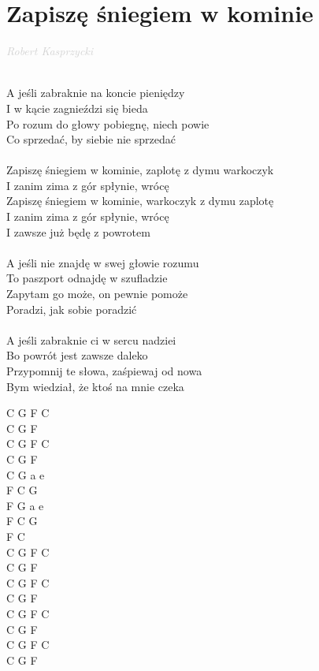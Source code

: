 \documentclass[a5paper, 10pt]{book}
\begin{document}
\section{Zapiszę śniegiem w kominie}\textcolor{lightgray}{\textit{Robert Kasprzycki
}}\\~\\
\begin{minipage}[t]{0.8\textwidth}
A jeśli zabraknie na koncie pieniędzy\\
I w kącie zagnieździ się bieda\\
Po rozum do głowy pobiegnę, niech powie\\
Co sprzedać, by siebie nie sprzedać\\
\\
\hspace*{5mm}Zapiszę śniegiem w kominie, zaplotę z dymu warkoczyk\\
\hspace*{5mm}I zanim zima z gór spłynie, wrócę\\
\hspace*{5mm}Zapiszę śniegiem w kominie, warkoczyk z dymu zaplotę\\
\hspace*{5mm}I zanim zima z gór spłynie, wrócę\\
\hspace*{5mm}I zawsze już będę z powrotem\\
\\
A jeśli nie znajdę w swej głowie rozumu\\
To paszport odnajdę w szufladzie\\
Zapytam go może, on pewnie pomoże\\
Poradzi, jak sobie poradzić\\
\\
A jeśli zabraknie ci w sercu nadziei\\
Bo powrót jest zawsze daleko\\
Przypomnij te słowa, zaśpiewaj od nowa\\
Bym wiedział, że ktoś na mnie czeka\\
\end{minipage}
\begin{minipage}[t]{0.2\textwidth}
C G F C\\
C G  F\\
C G F C\\
C G  F\\

C G a e\\
F C  G\\
F G a e\\
F C  G\\
F C  \\

C G F C\\
C G  F\\
C G F C\\
C G  F\\

C G F C\\
C G  F\\
C G F C\\
C G  F\\
\end{minipage}
\end{document}
